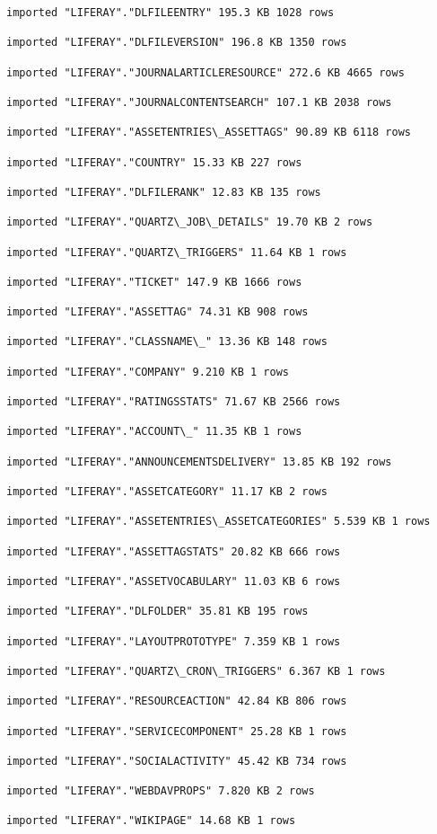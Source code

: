 \begin{verbatim}
imported "LIFERAY"."DLFILEENTRY" 195.3 KB 1028 rows
 
imported "LIFERAY"."DLFILEVERSION" 196.8 KB 1350 rows
 
imported "LIFERAY"."JOURNALARTICLERESOURCE" 272.6 KB 4665 rows
 
imported "LIFERAY"."JOURNALCONTENTSEARCH" 107.1 KB 2038 rows
 
imported "LIFERAY"."ASSETENTRIES\_ASSETTAGS" 90.89 KB 6118 rows
 
imported "LIFERAY"."COUNTRY" 15.33 KB 227 rows
 
imported "LIFERAY"."DLFILERANK" 12.83 KB 135 rows
 
imported "LIFERAY"."QUARTZ\_JOB\_DETAILS" 19.70 KB 2 rows
 
imported "LIFERAY"."QUARTZ\_TRIGGERS" 11.64 KB 1 rows
 
imported "LIFERAY"."TICKET" 147.9 KB 1666 rows
 
imported "LIFERAY"."ASSETTAG" 74.31 KB 908 rows

imported "LIFERAY"."CLASSNAME\_" 13.36 KB 148 rows
 
imported "LIFERAY"."COMPANY" 9.210 KB 1 rows
 
imported "LIFERAY"."RATINGSSTATS" 71.67 KB 2566 rows
 
imported "LIFERAY"."ACCOUNT\_" 11.35 KB 1 rows
 
imported "LIFERAY"."ANNOUNCEMENTSDELIVERY" 13.85 KB 192 rows
 
imported "LIFERAY"."ASSETCATEGORY" 11.17 KB 2 rows
 
imported "LIFERAY"."ASSETENTRIES\_ASSETCATEGORIES" 5.539 KB 1 rows
 
imported "LIFERAY"."ASSETTAGSTATS" 20.82 KB 666 rows

imported "LIFERAY"."ASSETVOCABULARY" 11.03 KB 6 rows
 
imported "LIFERAY"."DLFOLDER" 35.81 KB 195 rows

imported "LIFERAY"."LAYOUTPROTOTYPE" 7.359 KB 1 rows
 
imported "LIFERAY"."QUARTZ\_CRON\_TRIGGERS" 6.367 KB 1 rows
 
imported "LIFERAY"."RESOURCEACTION" 42.84 KB 806 rows
 
imported "LIFERAY"."SERVICECOMPONENT" 25.28 KB 1 rows
 
imported "LIFERAY"."SOCIALACTIVITY" 45.42 KB 734 rows
 
imported "LIFERAY"."WEBDAVPROPS" 7.820 KB 2 rows
 
imported "LIFERAY"."WIKIPAGE" 14.68 KB 1 rows
 

\end{verbatim}
